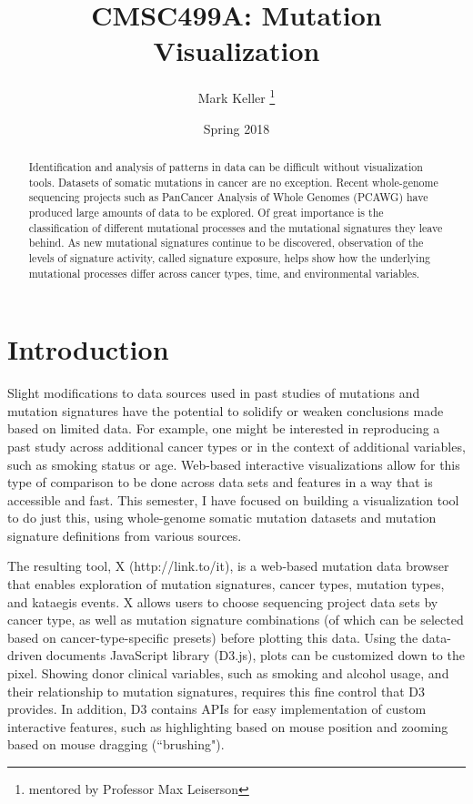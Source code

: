 \documentclass[12pt, letterpaper]{article}
\title{CMSC499A: Mutation Visualization}
\author{Mark Keller \thanks{mentored by Professor Max Leiserson}}
\date{Spring 2018}
\begin{document}
\maketitle

\begin{abstract}
Identification and analysis of patterns in data can be difficult without visualization tools. 
Datasets of somatic mutations in cancer are no exception. 
Recent whole-genome sequencing projects such as PanCancer Analysis of Whole Genomes (PCAWG) have produced large amounts of data to be explored.
Of great importance is the classification of different mutational processes and the mutational signatures\cite{alexandrov2013signatures} they leave behind.
As new mutational signatures continue to be discovered, observation of the levels of signature activity, called signature exposure, helps show how the underlying mutational processes differ across cancer types, time, and environmental variables.
\end{abstract}

\section{Introduction}
Slight modifications to data sources used in past studies of mutations and mutation signatures have the potential to solidify or weaken conclusions made based on limited data.
For example, one might be interested in reproducing a past study across additional cancer types or in the context of additional variables, such as smoking status or age.
Web-based interactive visualizations allow for this type of comparison to be done across data sets and features in a way that is accessible and fast.
This semester, I have focused on building a visualization tool to do just this, using whole-genome somatic mutation datasets and mutation signature definitions from various sources.

The resulting tool, X (http://link.to/it), is a web-based mutation data browser that enables exploration of mutation signatures, cancer types, mutation types, and kataegis events.
X allows users to choose sequencing project data sets by cancer type, as well as mutation signature combinations (of which can be selected based on cancer-type-specific presets) before plotting this data. 
Using the data-driven documents JavaScript library (D3.js)\cite{bostock2011d3}, plots can be customized down to the pixel.
Showing donor clinical variables, such as smoking and alcohol usage, and their relationship to mutation signatures, requires this fine control that D3 provides.
In addition, D3 contains APIs for easy implementation of custom interactive features, such as highlighting based on mouse position and zooming based on mouse dragging (``brushing"). 
\end{document}

